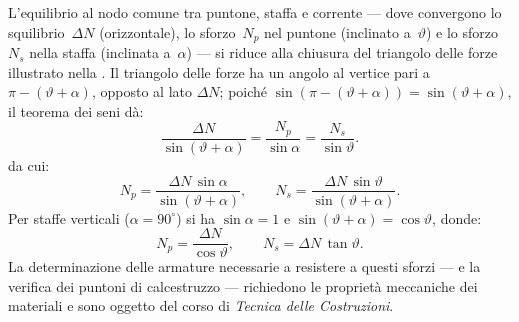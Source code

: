 L'equilibrio al nodo comune tra puntone, staffa e
corrente --- dove convergono lo squilibrio~$\Delta N$
(orizzontale), lo sforzo~$N_p$ nel puntone
(inclinato a~$\vartheta$) e lo sforzo~$N_s$ nella
staffa (inclinata a~$\alpha$) --- si riduce alla
chiusura del triangolo delle forze illustrato nella
. 
Il triangolo delle forze ha un angolo al vertice
pari a $\pi - (\vartheta+\alpha)$, opposto al lato
$\Delta N$; poiché $\sin(\pi-(\vartheta+\alpha))
= \sin(\vartheta+\alpha)$, il teorema dei seni dà:
\begin{equation}\label{eq:triangolo_forze}
	\frac{\Delta N}{\sin(\vartheta+\alpha)}
	= \frac{N_p}{\sin\alpha}
	= \frac{N_s}{\sin\vartheta}.
\end{equation}
da cui:
\begin{equation}\label{eq:Np_Ns}
	N_p = \frac{\Delta N\,\sin\alpha}{\sin(\vartheta+\alpha)},
	\qquad
	N_s = \frac{\Delta N\,\sin\vartheta}{\sin(\vartheta+\alpha)}.
\end{equation}
Per staffe verticali ($\alpha = 90^\circ$) si ha
$\sin\alpha = 1$ e $\sin(\vartheta+\alpha) = \cos\vartheta$,
donde:
\begin{equation}\label{eq:Np_Ns_vert}
	N_p = \frac{\Delta N}{\cos\vartheta},
	\qquad
	N_s = \Delta N\,\tan\vartheta.
\end{equation}
La determinazione delle armature necessarie a
resistere a questi sforzi --- e la verifica dei
puntoni di calcestruzzo --- richiedono le proprietà
meccaniche dei materiali e sono oggetto del corso
di \emph{Tecnica delle Costruzioni}.

